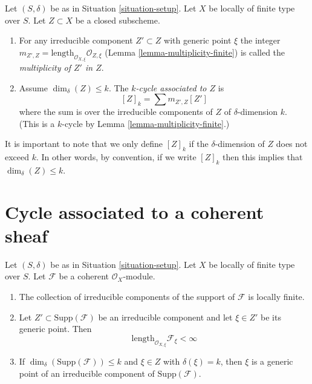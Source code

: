 \begin{definition}
\label{definition-cycle-associated-to-closed-subscheme}
Let $(S, \delta)$ be as in Situation \ref{situation-setup}.
Let $X$ be locally of finite type over $S$.
Let $Z \subset X$ be a closed subscheme.
\begin{enumerate}
\item For any irreducible component $Z' \subset Z$ with generic point $\xi$
the integer
$m_{Z', Z} = \text{length}_{\mathcal{O}_{X, \xi}} \mathcal{O}_{Z, \xi}$
(Lemma \ref{lemma-multiplicity-finite})
is called the {\it multiplicity of $Z'$ in $Z$}.
\item Assume $\dim_\delta(Z) \leq k$.
The {\it $k$-cycle associated to $Z$} is
$$
[Z]_k
=
\sum m_{Z', Z}[Z']
$$
where the sum is over the irreducible components of $Z$
of $\delta$-dimension $k$. (This is a $k$-cycle by
Lemma \ref{lemma-multiplicity-finite}.)
\end{enumerate}
\end{definition}

\noindent
It is important to note that we only define $[Z]_k$ if the $\delta$-dimension
of $Z$ does not exceed $k$. In other words, by convention, if we write
$[Z]_k$ then this implies that $\dim_\delta(Z) \leq k$.



\section{Cycle associated to a coherent sheaf}
\label{section-cycle-of-coherent-sheaf}



\begin{lemma}
\label{lemma-length-finite}
Let $(S, \delta)$ be as in Situation \ref{situation-setup}.
Let $X$ be locally of finite type over $S$.
Let $\mathcal{F}$ be a coherent $\mathcal{O}_X$-module.
\begin{enumerate}
\item The collection of irreducible components of the support of
$\mathcal{F}$ is locally finite.
\item Let $Z' \subset \text{Supp}(\mathcal{F})$
be an irreducible component and
let $\xi \in Z'$ be its generic point.
Then
$$
\text{length}_{\mathcal{O}_{X, \xi}} \mathcal{F}_\xi < \infty
$$
\item If $\dim_\delta(\text{Supp}(\mathcal{F})) \leq k$
and $\xi \in Z$ with $\delta(\xi) = k$, then $\xi$ is a
generic point of an irreducible component of $\text{Supp}(\mathcal{F})$.
\end{enumerate}
\end{lemma}


